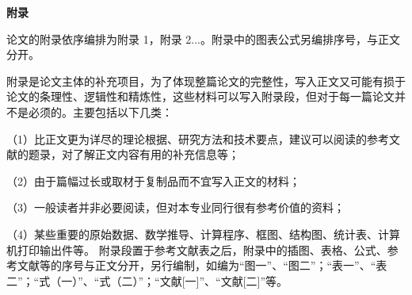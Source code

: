 \fontsize{12}{20}\selectfont
{}
\begin{center}
	\vspace*{-2mm}
	\heiti\fontsize{16}{16}\selectfont\textbf{附\hspace{5.7mm}录}
\end{center}

论文的附录依序编排为附录 1，附录 2...。附录中的图表公式另编排序号，与正文分开。

附录是论文主体的补充项目，为了体现整篇论文的完整性，写入正文又可能有损于论文的条理性、逻辑性和精炼性，这些材料可以写入附录段，但对于每一篇论文并不是必须的。主要包括以下几类：

（1）比正文更为详尽的理论根据、研究方法和技术要点，建议可以阅读的参考文献的题录，对了解正文内容有用的补充信息等；

（2）由于篇幅过长或取材于复制品而不宜写入正文的材料；

（3）一般读者并非必要阅读，但对本专业同行很有参考价值的资料；

（4）某些重要的原始数据、数学推导、计算程序、框图、结构图、统计表、计算机打印输出件等。
附录段置于参考文献表之后，附录中的插图、表格、公式、参考文献等的序号与正文分开，另行编制，如编为“图一”、“图二”；“表一”、“表二”；“式（一）”、“式（二）”；“文献[一]”、“文献[二]”等。
